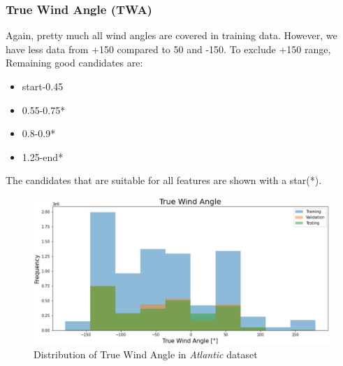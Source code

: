 \subsubsection{True Wind Angle (TWA)}
Again, pretty much all wind angles are covered in training data. However, we have less data from +150 compared to 50 and -150.
To exclude +150 range, Remaining good candidates are:
\begin{itemize}
    \item start-0.45
    \item 0.55-0.75*
    \item 0.8-0.9*
    \item 1.25-end*
\end{itemize}
The candidates that are suitable for all features are shown with a star(*).

\begin{figure}[h]
\centering
\includegraphics[width = \hsize]{figures/distributions/atlantic-TWA.png}
\caption{Distribution of True Wind Angle in \textit{Atlantic} dataset \cite{charles}}
\end{figure}

